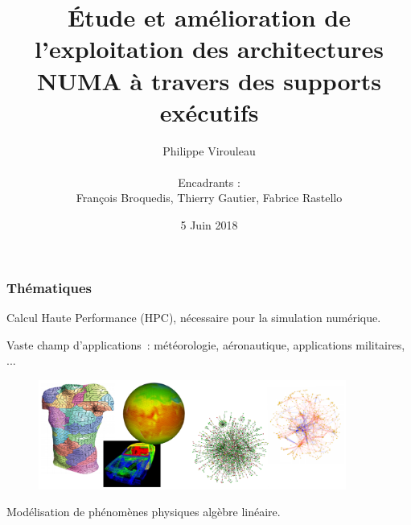 \documentclass[xcolor={usenames,dvipsnames,svgnames,table}, aspectratio=43]{beamer}
\title[Soutenance de thèse]{Étude et amélioration de l'exploitation des architectures NUMA à travers des supports exécutifs
  \vspace{-25pt}
}
\author[Philippe Virouleau]{
Philippe Virouleau\\
  ~\\
\small Encadrants :\\
François Broquedis, Thierry Gautier, Fabrice Rastello}
\institute[CORSE/AVALON]{Inria - CORSE/AVALON teams}
\date{5 Juin 2018}
\begin{document}








\mymaketitle

\begin{frame}
\frametitle{Thématiques}

  Calcul Haute Performance (HPC), nécessaire pour la simulation numérique.

  Vaste champ d'applications~: météorologie, aéronautique, applications militaires, ...

  \begin{figure}
    \includegraphics[width=0.9\textwidth]{graph/simulation.pdf}
  \end{figure}


  Modélisation de phénomènes physiques  algèbre linéaire.
\end{frame}
\end{document}

